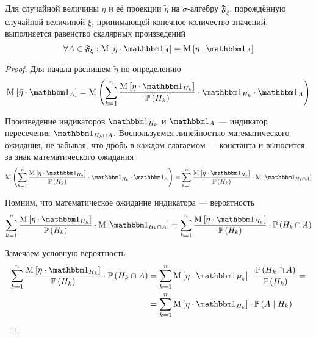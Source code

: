 \begin{lemma}
    Для случайной величины $\eta$ и её проекции $\tilde{\eta}$
    на $\sigma$-алгебру $\mathfrak{F}_\xi$,
    порождённую случайной величиной $\xi$,
    принимающей конечное количество значений,
    выполняется равенство скалярных произведений
    \begin{equation}\label{scalarMulEquality}
        \forall A \in \mathfrak{F}_\xi:
            \Mean{ \tilde{\eta} \cdot \indicatorof{A} }
                = \Mean{ \eta \cdot \indicatorof{A} }
    \end{equation}
\end{lemma}
\begin{proof}
Для начала распишем $\tilde{\eta}$ по определению
$$\Mean{ \tilde{\eta} \cdot \indicatorof{A} }
    = \mean{\left( \sum_{k=1}^n
        \frac{\Mean{ \eta \cdot \indicatorof{H_k} }}
            {\probability{H_k}}
        \cdot \indicatorof{H_k} \cdot \indicatorof{A} \right)}$$

Произведение индикаторов $\indicatorof{H_k}$ и $\indicatorof{A}$ --- индикатор
пересечения $\indicatorof{H_k \cap A}$.
Воспользуемся линейностью математического ожидания, не забывая,
что дробь в каждом слагаемом --- константа
и выносится за знак математического ожидания
$$\mean{\left( \sum_{k=1}^n
        \frac{\Mean{ \eta \cdot \indicatorof{H_k} }}
            {\probability{H_k}}
        \cdot \indicatorof{H_k} \cdot \indicatorof{A} \right)}
    = \sum_{k=1}^n
        \frac{\Mean{ \eta \cdot \indicatorof{H_k} }}
            {\probability{H_k}}
        \cdot \Mean{ \indicatorof{H_k \cap A} }$$

Помним, что математическое ожидание индикатора --- вероятность
$$\sum_{k=1}^n
    \frac{\Mean{ \eta \cdot \indicatorof{H_k} }}{\probability{H_k}}
        \cdot \Mean{ \indicatorof{H_k \cap A} }
    = \sum_{k=1}^n \frac{\Mean{ \eta \cdot \indicatorof{H_k} }}
        {\probability{H_k}}
        \cdot \probability{H_k \cap A}$$

Замечаем условную вероятность
\begin{align*}
    \sum_{k=1}^n \frac{\Mean{ \eta \cdot \indicatorof{H_k} }}
        {\probability{H_k}} \cdot \probability{H_k \cap A}
    &= \sum_{k=1}^n \Mean{ \eta \cdot \indicatorof{H_k} }
        \cdot \frac{\probability{H_k \cap A}}{\probability{H_k}} = \\
    &= \sum_{k=1}^n \Mean{ \eta \cdot \indicatorof{H_k} }
        \cdot \probability{A \mcond H_k}
\end{align*}


\end{proof}
